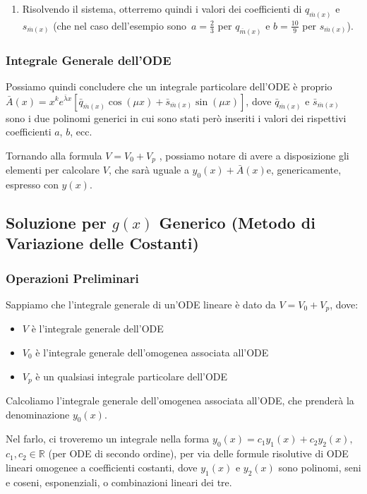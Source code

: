 \documentclass[a4paper,11pt]{article}
\begin{document}
\begin{enumerate}[label=\alph{enumi}.]
    \item Risolvendo il sistema, otterremo quindi i valori dei coefficienti di $q_{\overline{m}(x)}$ e $s_{\overline{m}(x)}$ (che nel caso dell'esempio sono $a=\frac{2}{3}$ per $q_{\overline{m}(x)}$ e $b=\frac{10}{9}$ per $s_{\overline{m}(x)}$).
\end{enumerate}

\subsubsection[Integrale Generale]{Integrale Generale dell'ODE}
Possiamo quindi concludere che un integrale particolare dell'ODE è proprio $\bar{A}(x)=x^ke^{\bar{\lambda} x}[\bar{q}_{\overline{m}(x)}\cos{(\mu x)}+\bar{s}_{\overline{m}(x)}\sin{(\mu x)}]$, dove $\bar{q}_{\overline{m}(x)}$ e $\bar{s}_{\overline{m}(x)}$ sono i due polinomi generici in cui sono stati però inseriti i valori dei rispettivi coefficienti $a$, $b$, ecc.

\noindent Tornando alla formula $V=V_0+V_p$ , possiamo notare di avere a disposizione gli elementi per calcolare $V$, che sarà uguale a $y_0(x)+\bar{A}(x)$\footnotemark[3] e, genericamente, espresso con $y(x)$.

\subsection[Termine Noto Generico]{Soluzione per $g(x)$ Generico (Metodo di Variazione delle Costanti)}

\subsubsection{Operazioni Preliminari}
Sappiamo che l'integrale generale di un'ODE lineare è dato da $V=V_0+V_p$, dove:
\begin{itemize}
	\item $V$ è l'integrale generale dell'ODE
	\item $V_0$ è l'integrale generale dell'omogenea associata all'ODE
	\item $V_p$ è un qualsiasi integrale particolare dell'ODE
\end{itemize}
Calcoliamo l'integrale generale dell'omogenea associata all'ODE, che prenderà la denominazione $y_0(x)$.

\noindent Nel farlo, ci troveremo un integrale nella forma $y_0(x)=c_1y_1(x)+c_2y_2(x),$ $c_1,c_2\in\mathbb{R}$ (per ODE di secondo ordine), per via delle formule risolutive di ODE lineari omogenee a coefficienti costanti, dove $y_1(x)$ e $y_2(x)$ sono polinomi, seni e coseni, esponenziali, o combinazioni lineari dei tre.
\end{document}
